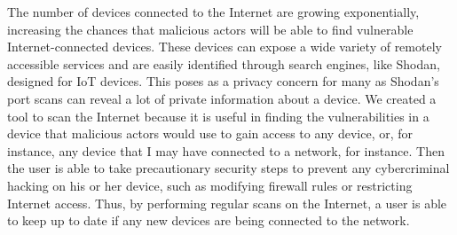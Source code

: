 

The number of devices connected to the Internet are growing exponentially, increasing
the chances that malicious actors will be able to find vulnerable Internet-connected devices.
These devices can expose a wide variety of remotely accessible services
and are easily identified through search engines, like Shodan, designed for IoT devices.
This poses as a privacy concern for many as Shodan's port scans can reveal a lot of
private information about a device. We created a tool to scan the Internet
because it is useful in finding the vulnerabilities in a device that malicious actors
would use to gain access to any device, or, for instance, any device that
I may have connected to a network, for instance. Then the user is able to 
take precautionary security steps to prevent any cybercriminal hacking on his or her
device, such as modifying firewall rules or restricting Internet access.
Thus, by performing regular scans on the Internet, a user is able to keep up to date
if any new devices are being connected to the network. 